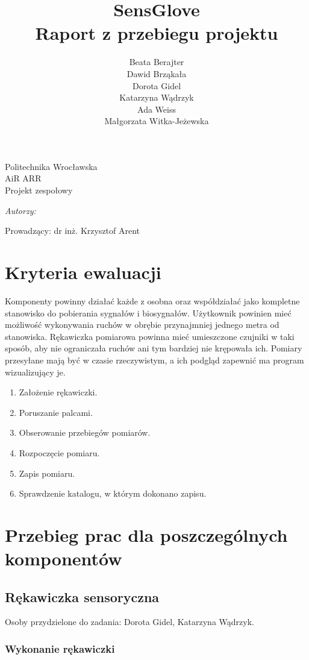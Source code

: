 ﻿\documentclass{article}
\author{Beata Berajter\\
Dawid Brząkała\\
Dorota Gidel\\
Katarzyna Wądrzyk\\
Ada Weiss\\
Małgorzata Witka-Jeżewska\\
 }
\title{SensGlove\\Raport z przebiegu projektu}
\makeatletter
\renewcommand{\maketitle}{\begin{titlepage}
    \vspace*{1cm}
    \begin{center}
    Politechnika Wrocławska\\
    AiR ARR\\
 Projekt zespołowy
    \end{center}
      \vspace{3cm}
    \begin{center}

     \LARGE \textsc {\@title}
         \end{center}
     \vspace{1cm}

    \begin{center}
    \textit{ Autorzy:}\\
   \textit{\@author}
     \end{center}
      \vspace{1cm}

     \begin{center}

    Prowadzący:
  dr inż. Krzysztof Arent
    \end{center}

    \vspace*{\stretch{6}}
    \begin{center}
    \@date
    \end{center}
  \end{titlepage}
}
\makeatother
\begin{document}
\maketitle
\newpage
\tableofcontents
\newpage



\section{Kryteria ewaluacji}
Komponenty powinny działać każde z osobna oraz współdziałać jako kompletne stanowisko do pobierania sygnałów i biosygnałów. Użytkownik powinien mieć możliwość wykonywania ruchów w obrębie przynajmniej jednego metra od stanowiska. Rękawiczka pomiarowa powinna mieć umieszczone czujniki w taki sposób, aby nie ograniczała ruchów ani tym bardziej nie krępowała ich. Pomiary przesyłane mają być w czasie rzeczywistym, a ich podgląd zapewnić ma program wizualizujący je.
\begin{enumerate}
	\item Założenie rękawiczki.
	\item Poruszanie palcami.
	\item Obserowanie przebiegów pomiarów.
	\item Rozpoczęcie pomiaru.
	\item Zapis pomiaru.
	\item Sprawdzenie katalogu, w którym dokonano zapisu.
\end{enumerate}
%
%
%
%
%
\section{Przebieg prac dla poszczególnych komponentów}
\subsection{Rękawiczka sensoryczna}
Osoby przydzielone do zadania: Dorota Gidel, Katarzyna Wądrzyk.
\subsubsection{Wykonanie rękawiczki}
\end{document}
